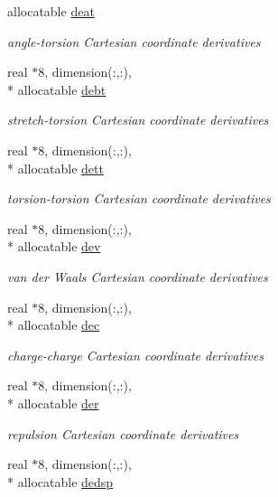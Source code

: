 \begin{DoxyCompactItemize}
allocatable \hyperlink{classderiv_a45a3db97ce3e3b1c26c10d4231cb7081}{deat}
\begin{DoxyCompactList}\small\item\em angle-\/torsion Cartesian coordinate derivatives \end{DoxyCompactList}\item 
real $\ast$8, dimension(\-:,\-:), \\*
allocatable \hyperlink{classderiv_abe7c91d2bc97033c899941792db7828a}{debt}
\begin{DoxyCompactList}\small\item\em stretch-\/torsion Cartesian coordinate derivatives \end{DoxyCompactList}\item 
real $\ast$8, dimension(\-:,\-:), \\*
allocatable \hyperlink{classderiv_ae4cc6fb1e2dc67a34d2b42b76478ddcb}{dett}
\begin{DoxyCompactList}\small\item\em torsion-\/torsion Cartesian coordinate derivatives \end{DoxyCompactList}\item 
real $\ast$8, dimension(\-:,\-:), \\*
allocatable \hyperlink{classderiv_a5702b7756c4db2eaac0a462ea67fa477}{dev}
\begin{DoxyCompactList}\small\item\em van der Waals Cartesian coordinate derivatives \end{DoxyCompactList}\item 
real $\ast$8, dimension(\-:,\-:), \\*
allocatable \hyperlink{classderiv_a2ad8ee0f9e05642b554dffbabaea5cdf}{dec}
\begin{DoxyCompactList}\small\item\em charge-\/charge Cartesian coordinate derivatives \end{DoxyCompactList}\item 
real $\ast$8, dimension(\-:,\-:), \\*
allocatable \hyperlink{classderiv_a78988c04c9c26c2471a265d2e4793726}{der}
\begin{DoxyCompactList}\small\item\em repulsion Cartesian coordinate derivatives \end{DoxyCompactList}\item 
real $\ast$8, dimension(\-:,\-:), \\*
allocatable \hyperlink{classderiv_a16062b367c27ed1b00bd4fe6900797ea}{dedsp}

\end{DoxyCompactItemize}
